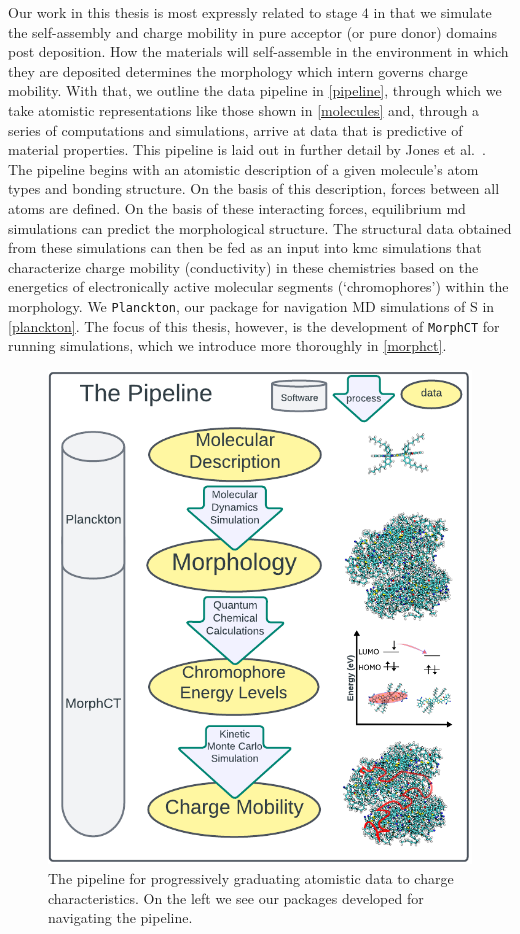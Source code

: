 Our work in this thesis
is most expressly related to stage $4$ in that we simulate the self-assembly and
charge mobility in pure acceptor (or
pure donor) domains post deposition. 
How the materials will self-assemble in the environment in which they are deposited determines
the morphology which intern governs charge mobility. 
With that, we outline the data pipeline in \autoref{pipeline}, through which we take atomistic representations like
those shown in \autoref{molecules} and, through a series of computations and simulations,
arrive at data that is predictive of material properties. 
This pipeline is laid out in further detail by Jones et al.~\cite{jones2017}.
The pipeline begins with an atomistic description of a given molecule's atom types and bonding structure.
On the basis of this description, forces between all atoms are defined. On the basis of these interacting
forces, equilibrium \gls{md} simulations can predict the morphological structure. 
The structural data obtained from these simulations can then be fed as an input into \gls{kmc}
simulations that characterize charge mobility (conductivity) in these chemistries based on the
energetics of electronically active molecular segments (`chromophores') within the morphology.
We \texttt{Planckton}, our package for navigation MD simulations of S in \autoref{planckton}. 
The focus of this thesis, however, is the development of \texttt{MorphCT} for running  simulations, which we
introduce more thoroughly in \autoref{morphct}.

\begin{figure}
  \center
  \includegraphics[width=0.9\linewidth]{figures/the-pipeline.png} 
    \caption{The pipeline for progressively graduating atomistic data to charge characteristics. On the left
    we see our packages developed for navigating the pipeline.}
  \label{pipeline}
\end{figure}

